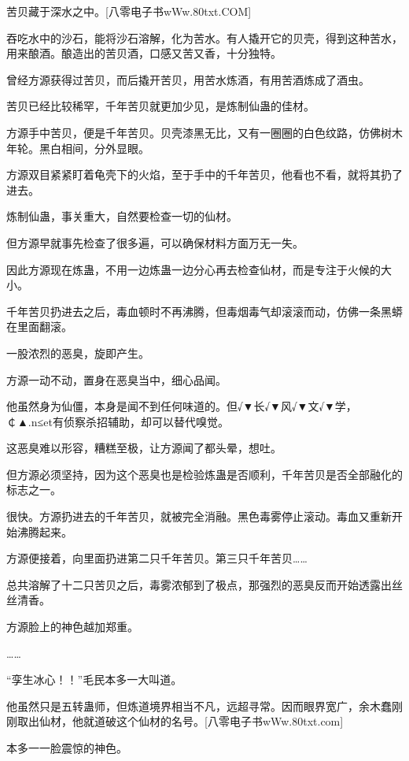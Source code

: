 
\begin{this_body}

苦贝藏于深水之中。[八零电子书wWw.80txt.COM]

吞吃水中的沙石，能将沙石溶解，化为苦水。有人撬开它的贝壳，得到这种苦水，用来酿酒。酿造出的苦贝酒，口感又苦又香，十分独特。

曾经方源获得过苦贝，而后撬开苦贝，用苦水炼酒，有用苦酒炼成了酒虫。

苦贝已经比较稀罕，千年苦贝就更加少见，是炼制仙蛊的佳材。

方源手中苦贝，便是千年苦贝。贝壳漆黑无比，又有一圈圈的白色纹路，仿佛树木年轮。黑白相间，分外显眼。

方源双目紧紧盯着龟壳下的火焰，至于手中的千年苦贝，他看也不看，就将其扔了进去。

炼制仙蛊，事关重大，自然要检查一切的仙材。

但方源早就事先检查了很多遍，可以确保材料方面万无一失。

因此方源现在炼蛊，不用一边炼蛊一边分心再去检查仙材，而是专注于火候的大小。

千年苦贝扔进去之后，毒血顿时不再沸腾，但毒烟毒气却滚滚而动，仿佛一条黑蟒在里面翻滚。

一股浓烈的恶臭，旋即产生。

方源一动不动，置身在恶臭当中，细心品闻。

他虽然身为仙僵，本身是闻不到任何味道的。但√▼长√▼风√▼文√▼学，￠▲.n≤et有侦察杀招辅助，却可以替代嗅觉。

这恶臭难以形容，糟糕至极，让方源闻了都头晕，想吐。

但方源必须坚持，因为这个恶臭也是检验炼蛊是否顺利，千年苦贝是否全部融化的标志之一。

很快。方源扔进去的千年苦贝，就被完全消融。黑色毒雾停止滚动。毒血又重新开始沸腾起来。

方源便接着，向里面扔进第二只千年苦贝。第三只千年苦贝……

总共溶解了十二只苦贝之后，毒雾浓郁到了极点，那强烈的恶臭反而开始透露出丝丝清香。

方源脸上的神色越加郑重。

……

“孪生冰心！！”毛民本多一大叫道。

他虽然只是五转蛊师，但炼道境界相当不凡，远超寻常。因而眼界宽广，余木蠢刚刚取出仙材，他就道破这个仙材的名号。[八零电子书wWw.80txt.com]

本多一一脸震惊的神色。


\end{this_body}
